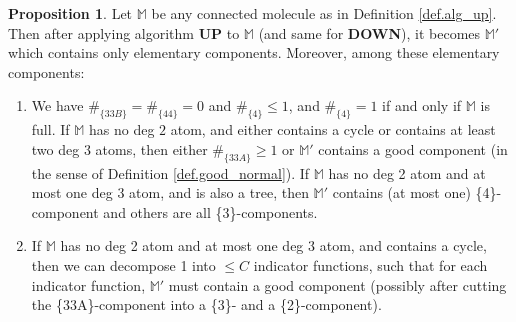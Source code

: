\documentclass[10pt, reqno]{amsart}
\newcommand{\Mb}{\mathbb M}
\theoremstyle{definition}
\newtheorem{proposition}[theorem]{Proposition}
\theoremstyle{remark}
\numberwithin{equation}{section}
\begin{document}
\begin{proposition}
\label{prop.alg_up} Let $\Mb$ be any connected molecule as in Definition \ref{def.alg_up}. Then after applying algorithm \textbf{UP} to $\Mb$ (and same for \textbf{DOWN}), it becomes $\Mb'$ which contains only elementary components. Moreover, among these elementary components:
\begin{enumerate}
\item We have $\#_{\{33B\}}=\#_{\{44\}}=0$ and $\#_{\{4\}}\leq 1$, and $\#_{\{4\}}=1$ if and only if $\Mb$ is full. If $\Mb$ has no deg $2$ atom, and either contains a cycle or contains at least two deg $3$ atoms, then either $\#_{\{33A\}}\geq 1$ or $\Mb'$ contains a good component (in the sense of Definition \ref{def.good_normal}). If $\Mb$ has no deg 2 atom and at most one deg 3 atom, and is also a tree, then $\Mb'$ contains (at most one) \{4\}-component and others are all \{3\}-components.
\item If $\Mb$ has no deg 2 atom and at most one deg 3 atom, and contains a cycle, then we can decompose 1 into $\leq C$ indicator functions, such that for each indicator function, $\Mb'$ must contain a good component (possibly after cutting the \{33A\}-component into a \{3\}- and a \{2\}-component).
\end{enumerate}
\end{proposition}
\end{document}
